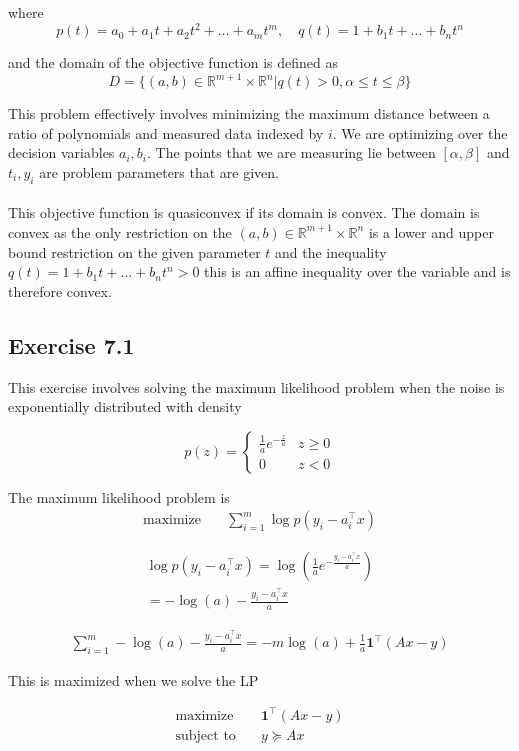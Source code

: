 where
\begin{equation}
    p(t) = a_0 + a_1 t + a_2 t^2 + \dots + a_m t^m, \quad q(t) = 1 + b_1 t + \dots + b_n t^n 
\end{equation}

and the domain of the objective function is defined as
\begin{equation}
    D = \{ (a,b) \in \mathbb{R}^{m+1} \times \mathbb{R}^n | q(t) > 0, \alpha \leq t \leq  \beta \}
\end{equation}

This problem effectively involves minimizing the maximum distance between a ratio of polynomials and measured data indexed by $i$. We are optimizing over the decision variables $a_i, b_i$. The points that we are measuring lie between $[\alpha, \beta]$ and $t_i, y_i$ are problem parameters that are given.
\\ \\
This objective function is quasiconvex if its domain is convex. The domain is convex as the only restriction on the $(a,b) \in \mathbb{R}^{m+1} \times \mathbb{R}^n$ is a lower and upper bound restriction on the given parameter $t$ and the inequality $q(t) = 1 + b_1 t + \dots + b_n t^n > 0$ this is an affine inequality over the variable and is therefore convex.
\\

\subsection{Exercise 7.1}
This exercise involves solving the maximum likelihood problem when the noise is exponentially distributed with density

\begin{equation}
    p(z) = 
    \begin{cases}
        \frac{1}{a} e^{-\frac{z}{a}} & z \geq 0 \\
        0 & z < 0
    \end{cases}
\end{equation}

The maximum likelihood problem is 
\begin{align}
  \text{maximize} & \quad \sum_{i=1}^m \log p(y_i - a_i^\top x)
\end{align}

\begin{gather}
   \log p(y_i - a_i^\top x) = \log (\frac{1}{a} e^{-\frac{y_i - a_i^\top x}{a}}) \\
   = -\log (a) -\frac{y_i - a_i^\top x}{a}
\end{gather}

\begin{gather}
    \sum_{i=1}^m -\log (a) -\frac{y_i - a_i^\top x}{a} = -m \log(a) + \frac{1}{a}\textbf{1}^\top(Ax -y) 
\end{gather}

This is maximized when we solve the LP

\begin{align}
  \text{maximize} & \quad \textbf{1}^\top (Ax-y) \\
  \text{subject to} & \quad y \succeq Ax
\end{align}